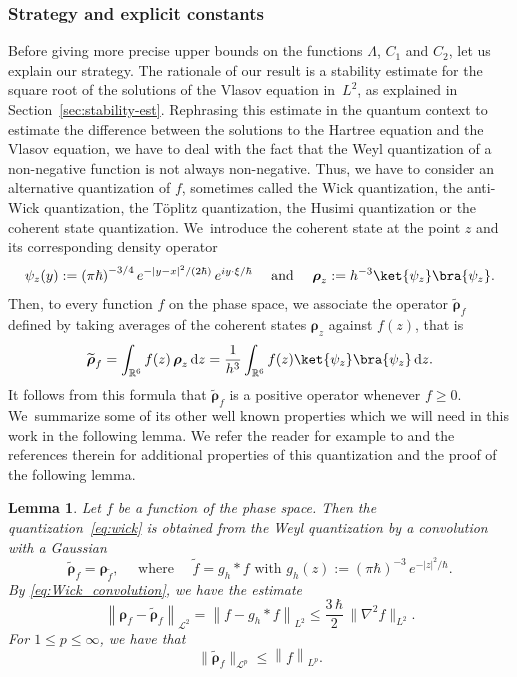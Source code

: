 \documentclass[JEP,XML,SOM,Unicode,NoEqCountersInSection,published]{cedram}
\newcommand {\aNrm}[2] {\lVert{#1}\rVert_{#2}}
\newtheorem{lem}{Lemma}[section]
\theoremstyle{definition}
\newcommand {\RR} {\mathbb R}
\newcommand {\RRd} {\RR^6}
\renewcommand {\L} {\mathcal L}
\let\lt\left
\let\rt\right
\renewcommand {\(} {\lt(}
\renewcommand {\)} {\rt)}
\newcommand {\n}[1] {\lt\lvert #1 \rt\rvert}
\newcommand {\nrm}[1] {\lt\lVert #1\rt\rVert}
\newcommand {\Nrm}[2] {\nrm{#1}_{#2}}
\renewcommand {\d} {\mathop{}\!\mathrm{d}}
\newcommand {\intdd} {\int_{\RRd}}
\newcommand {\op} {\boldsymbol{\rho}}
\begin{document}
\subsubsection{Strategy and explicit constants} Before giving more precise upper bounds on the functions $\Lambda$, $C_1$ and $C_2$, let us explain our strategy. The rationale of our result is a stability estimate for the square root of the solutions of the Vlasov equation in~$L^2$, as explained in Section~\ref{sec:stability-est}. Rephrasing this estimate in the quantum context to estimate the difference between the solutions to the Hartree equation and the Vlasov equation, we have to deal with the fact that the Weyl quantization of a non-negative function is not always non-negative. Thus, we have to consider an alternative quantization of $f$, sometimes called the Wick quantization, the anti-Wick quantization, the Töplitz quantization, the Husimi quantization or the coherent state quantization. We~introduce the coherent state at the point $z$ and its corresponding density operator
\begin{equation*}
\psi_z(y):= \(\pi \hbar\)^{-3/4} e^{-\n{y-x}^2/(2\hbar)}\,e^{i y\cdot \xi/\hbar} \quad \text{ and } \quad \op_z := h^{-3}\ket{\psi_z}\bra{\psi_z}.
\end{equation*}
Then, to every function $f$ on the phase space, we associate the operator $\widetilde{\op}_f$ defined by taking averages of the coherent states $\op_z$ against $f(z)$, that is
\begin{equation}\label{eq:wick}
\widetilde{\op}_f = \intdd f(z)\,\op_z\d z = \frac{1}{h^3}\intdd f(z) \ket{\psi_z}\bra{\psi_z}\d z.
\end{equation}
It follows from this formula that $\widetilde{\op}_f$ is a positive operator whenever $f\ge 0$. We~summarize some of its other well known properties which we will need in this work in the following lemma. We refer the reader for example to \cite{lions_sur_1993, lerner_fefferman-phong_2007} and the references therein for additional properties of this quantization and the proof of the following lemma.

\begin{lem}\label{lem:properties_of_Wick}
Let $f$ be a function of the phase space. Then the quantization~\eqref{eq:wick} is obtained from the Weyl quantization by a convolution with a Gaussian
\begin{equation}\label{eq:Wick_convolution}
\widetilde{\op}_f =\op_{\tilde f}, \quad \text{ where } \quad \widetilde f = g_h\ast f \text{ with } g_h(z):= (\pi\hbar)^{-3}\,e^{-\n{z}^2/\hbar}.
\end{equation}
By \eqref{eq:Wick_convolution}, we have the estimate
\begin{equation}\label{eq:Wick_Weyl_error}
\Nrm{\op_f-\widetilde{\op}_f}{\L^2} = \Nrm{f-g_h\ast f}{L^2} \le \frac{3\, \hbar}{2}\,\aNrm{\nabla^2 f}{L^2}.
\end{equation}
For $1\le p\le \infty$, we have that
\begin{equation}\label{eq:Wick_Schatten}
\aNrm{\widetilde{\op}_f}{\L^p}\le \Nrm{f}{L^p}.
\end{equation}
\end{lem}
\end{document}
